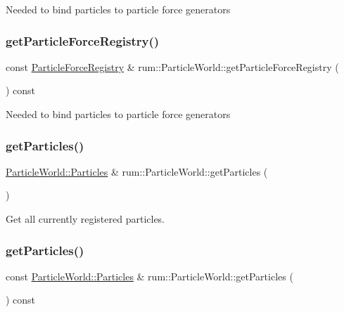 Needed to bind particles to particle force generators \mbox{\label{classrum_1_1_particle_world_ac71f7b09a54a7148027f4a57dc23c7b4}} 
\subsubsection{\texorpdfstring{get\+Particle\+Force\+Registry()}{getParticleForceRegistry()}\hspace{0.1cm}{\footnotesize\ttfamily [2/2]}}
{\footnotesize\ttfamily const \mbox{\hyperlink{classrum_1_1_particle_force_registry}{Particle\+Force\+Registry}} \& rum\+::\+Particle\+World\+::get\+Particle\+Force\+Registry (\begin{DoxyParamCaption}{ }\end{DoxyParamCaption}) const}

Needed to bind particles to particle force generators \mbox{\label{classrum_1_1_particle_world_ae14b992d5ae20001404b54dae72c59b9}} 
\subsubsection{\texorpdfstring{get\+Particles()}{getParticles()}\hspace{0.1cm}{\footnotesize\ttfamily [1/2]}}
{\footnotesize\ttfamily \mbox{\hyperlink{classrum_1_1_particle_world_ac172daef7c571097de59488881afa300}{Particle\+World\+::\+Particles}} \& rum\+::\+Particle\+World\+::get\+Particles (\begin{DoxyParamCaption}{ }\end{DoxyParamCaption})}

Get all currently registered particles. \mbox{\label{classrum_1_1_particle_world_a93b1798a5462e2b0a4da3ea559d5ed1d}} 
\subsubsection{\texorpdfstring{get\+Particles()}{getParticles()}\hspace{0.1cm}{\footnotesize\ttfamily [2/2]}}
{\footnotesize\ttfamily const \mbox{\hyperlink{classrum_1_1_particle_world_ac172daef7c571097de59488881afa300}{Particle\+World\+::\+Particles}} \& rum\+::\+Particle\+World\+::get\+Particles (\begin{DoxyParamCaption}{ }\end{DoxyParamCaption}) const}

